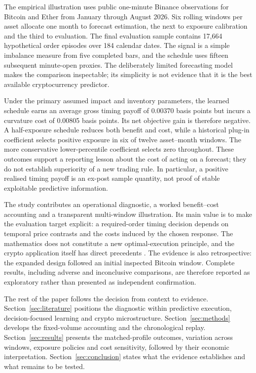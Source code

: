 The empirical illustration uses public one-minute Binance observations for Bitcoin and Ether from January through August 2026. Six rolling windows per asset allocate one month to forecast estimation, the next to exposure calibration and the third to evaluation. The final evaluation sample contains 17,664 hypothetical order episodes over 184 calendar dates. The signal is a simple imbalance measure from five completed bars, and the schedule uses fifteen subsequent minute-open proxies. The deliberately limited forecasting model makes the comparison inspectable; its simplicity is not evidence that it is the best available cryptocurrency predictor.

Under the primary assumed impact and inventory parameters, the learned schedule earns an average gross timing payoff of 0.00370 basis points but incurs a curvature cost of 0.00805 basis points. Its net objective gain is therefore negative. A half-exposure schedule reduces both benefit and cost, while a historical plug-in coefficient selects positive exposure in six of twelve asset--month windows. The more conservative lower-percentile coefficient selects zero throughout. These outcomes support a reporting lesson about the cost of acting on a forecast; they do not establish superiority of a new trading rule. In particular, a positive realised timing payoff is an ex-post sample quantity, not proof of stable exploitable predictive information.

The study contributes an operational diagnostic, a worked benefit--cost accounting and a transparent multi-window illustration. Its main value is to make the evaluation target explicit: a required-order timing decision depends on temporal price contrasts and the costs induced by the chosen response. The mathematics does not constitute a new optimal-execution principle, and the crypto application itself has direct precedents \citep{bundi2024,schnaubelt2022}. The evidence is also retrospective: the expanded design followed an initial inspected Bitcoin window. Complete results, including adverse and inconclusive comparisons, are therefore reported as exploratory rather than presented as independent confirmation.

The rest of the paper follows the decision from context to evidence. Section~\ref{sec:literature} positions the diagnostic within predictive execution, decision-focused learning and crypto microstructure. Section~\ref{sec:methods} develops the fixed-volume accounting and the chronological replay. Section~\ref{sec:results} presents the matched-profile outcomes, variation across windows, exposure policies and cost sensitivity, followed by their economic interpretation. Section~\ref{sec:conclusion} states what the evidence establishes and what remains to be tested.
